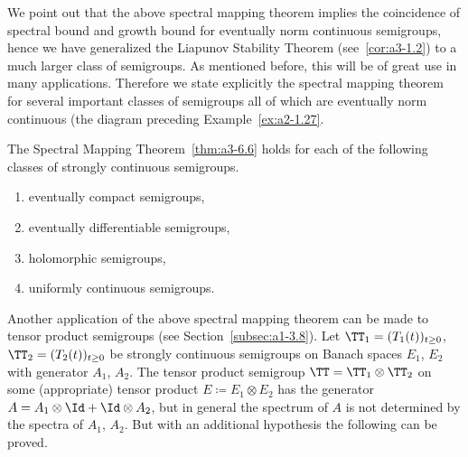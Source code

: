 We point out that the above spectral mapping theorem implies the coincidence of spectral bound and growth bound for eventually norm continuous semigroups, hence we have generalized the Liapunov Stability Theorem (see~\ref{cor:a3-1.2}) to a much larger class of semigroups.
As mentioned before, this will be of great use in many applications.
Therefore we state explicitly the spectral mapping theorem for several important classes of semigroups all of which are eventually norm continuous (\cf the diagram preceding Example~\ref{ex:a2-1.27}.
\begin{corollary}\label{cor:a3-6.7}
The Spectral Mapping Theorem~\ref{thm:a3-6.6}
holds for each of the following classes of strongly continuous semigroups.
\begin{enumerate}[\upshape (i)]
\item 
eventually compact semigroups,

\item 
eventually differentiable semigroups,

\item 
holomorphic semigroups,

\item 
uniformly continuous semigroups.
\end{enumerate}
\end{corollary}

Another application of the above spectral mapping theorem can be made to tensor product semigroups (see Section~\ref{subsec:a1-3.8}).
Let $\TT_{1} = (T_{1}(t))_{t\geq 0}$, $\TT_{2} = (T_{2}(t))_{t\geq 0}$ be strongly continuous semigroups on Banach spaces $E_{1}$, $E_{2}$ with generator $A_{1}$, $A_{2}$.
The tensor product semigroup $\TT = \TT_{1} \otimes \TT_{2}$ on some (appropriate) tensor product $E \coloneqq E_{1} \otimes E_{2}$ has the generator $A = A_{1}\otimes\Id + \Id\otimes A_{2}$, but in general the spectrum of\/ $A$ is not determined by the spectra of\/ $A_{1}$, $A_{2}$.
But with an additional hypothesis the following can be proved.

\phantom{x}

